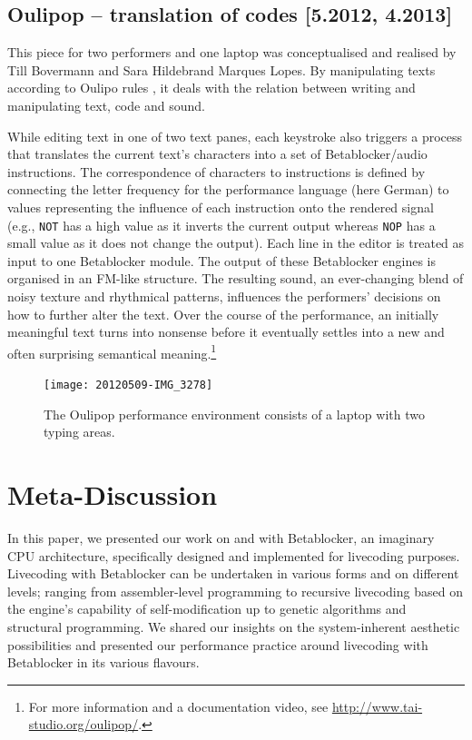 \documentclass[letterpaper, 12pt]{article}
\begin{document}
\subsection{Oulipop -- translation of codes [5.2012, 4.2013]}
\label{sub:oulipop}

This piece for two performers and one laptop was conceptualised and realised by Till Bovermann and Sara Hildebrand Marques Lopes.
By manipulating texts according to Oulipo rules \citep*{mathews2005-oul}, it deals with the relation between writing and manipulating text, code and sound.

While editing text in one of two text panes, each keystroke also triggers a process that translates the current text's characters into a set of Betablocker/audio instructions. 
The correspondence of characters to instructions is defined by connecting the letter frequency for the performance language (here German) to values representing the influence of each instruction onto the rendered signal (e.g., \texttt{NOT} has a high value as it inverts the current output whereas \texttt{NOP} has a small value as it does not change the output).
Each line in the editor is treated as input to one Betablocker module.
The output of these Betablocker engines is organised in an FM-like structure. 
The resulting sound, an ever-changing blend of noisy texture and rhythmical patterns, influences the performers' decisions on how to further alter the text. 
Over the course of the performance, an initially meaningful text turns into nonsense before it eventually settles into a new and often surprising semantical meaning.\footnote{For more information and a documentation video, see \url{http://www.tai-studio.org/oulipop/}.}
\begin{figure}
	\centering
		\texttt{[image: 20120509-IMG\_3278]}
	\caption{The Oulipop performance environment consists of a laptop with two typing areas.}
	\label{fig:fig_20120509-IMG_3278}
\end{figure}
\parskip 18pt

\section{Meta-Discussion}
\label{sec:meta}

In this paper, we presented our work on and with Betablocker, an imaginary CPU architecture, specifically designed and implemented for livecoding purposes.
Livecoding with Betablocker can be undertaken in various forms and on different levels; ranging from assembler-level programming to recursive livecoding based on the engine's capability of self-modification up to genetic algorithms and structural programming.
We shared our insights on the system-inherent aesthetic possibilities and presented our performance practice around livecoding with Betablocker in its various flavours.
\end{document}
